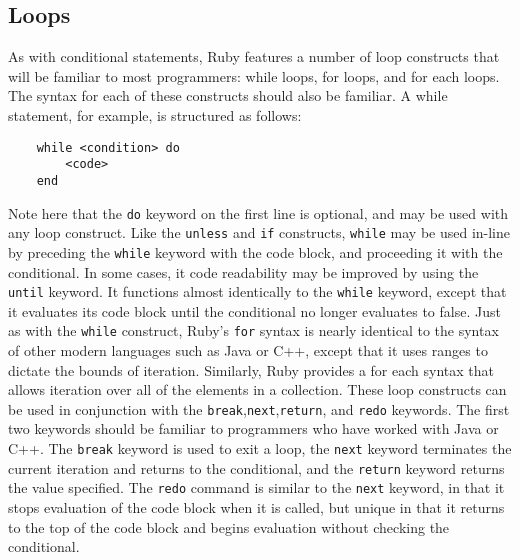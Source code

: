 \documentclass[12pt]{article}
\begin{document}
\subsection{Loops}
As with conditional statements, Ruby features a number of loop constructs that will be familiar to most programmers: while loops, for loops, and for each loops. The syntax for each of these constructs should also be familiar. A while statement, for example, is structured as follows:
\begin{lstlisting}
    while <condition> do
        <code>
    end
\end{lstlisting}
Note here that the \verb|do| keyword on the first line is optional, and may be used with any loop construct\cite{ctrl_struct}. 
Like the \verb|unless| and \verb|if| constructs, \verb|while| may be used in-line by preceding the \verb|while| keyword with the code block, and proceeding it with the conditional. In some cases, it code readability may be improved by using the \verb|until| keyword. It functions almost identically to the \verb|while| keyword, except that it evaluates its code block until the conditional no longer evaluates to false\cite{ctrl_struct}.
Just as with the \verb|while| construct, Ruby's \verb|for| syntax is nearly identical to the syntax of other modern languages such as Java or C++, except that it uses ranges to dictate the bounds of iteration. Similarly, Ruby provides a for each syntax that allows iteration over all of the elements in a collection\cite{flow_control}.
These loop constructs can be used in conjunction with the \verb|break|,\verb|next|,\verb|return|, and \verb|redo| keywords. The first two keywords should be familiar to programmers who have worked with Java or C++. The \verb|break| keyword is used to exit a loop, the \verb|next| keyword terminates the current iteration and returns to the conditional, and the \verb|return| keyword returns the value specified. The \verb|redo| command is similar to the \verb|next| keyword, in that it stops evaluation of the code block when it is called, but unique in that it returns to the top of the code block and begins evaluation without checking the conditional\cite{flow_control}.
\end{document}
